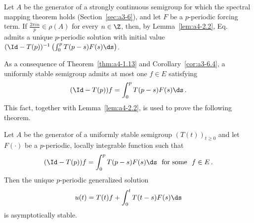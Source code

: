 \begin{remark}\label{rem:a4-2.3}
Let $A$ be the generator of a strongly continuous semigroup for which the spectral mapping theorem holds (Section~\ref{sec:a3-6}), and let $F$ be a $p$-periodic forcing term.
If\/ $\frac{2\pi in}{p} \in \rho(A)$ for every $n \in \Z$, then, by Lemma~\ref{lem:a4-2.2}, Eq.~
admits a unique $p$-periodic solution with initial value $(\Id - T(p))^{-1} \left(\int_{0}^{p} T(p-s)F(s)  \ds\right)$.
\end{remark}
As a consequence of Theorem~\ref{thm:a4-1.13}  and Corollary~\ref{cor:a3-6.4},  a uniformly stable semigroup admits at most one $f \in E$ satisfying 
\[
(\Id-T(p))f = \int_{0}^{p} T(p-s)F(s)  \ds\,.
\]
This fact, together with Lemma~\ref{lem:a4-2.2}, is used to prove the following theorem.
\begin{theorem}\label{thm:a4-2.4}
Let $A$ be the generator of a uniformly stable semigroup $(T(t))_{t \geq 0}$ and let $F(\cdot)$ be a $p$-periodic, locally integrable function such that 
\[{
(\Id - T(p))f = \int_{0}^{p} T(p-s)F(s)  \ds \ \text{ for some } \ f \in E\,.
}
\]
Then the unique $p$-periodic generalized solution
\[
u(t) = T(t)f + \int_{0}^{t} T(t-s)F(s)  \ds
\]
is asymptotically stable.
\end{theorem}

